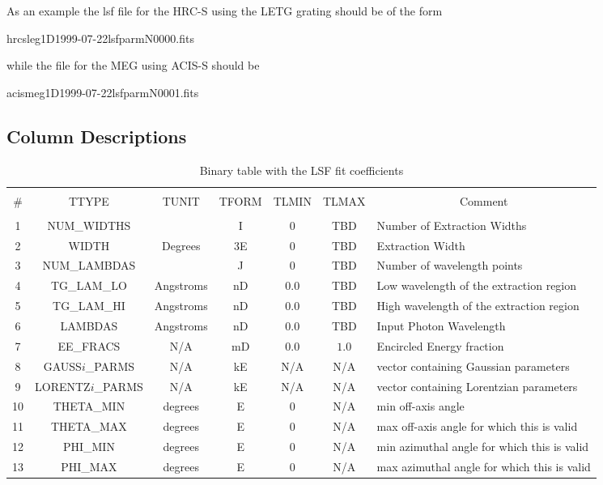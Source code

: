 \documentclass[twoside]{article}
\begin{document}
As an example the lsf file for the HRC-S using the LETG grating should 
be of the form 

hrcsleg1D1999-07-22lsfparmN0000.fits

while the file for the MEG using ACIS-S should be 

acismeg1D1999-07-22lsfparmN0001.fits

\subsection{Column Descriptions}

\begin{table}[h]
\begin{center}
{\small
\begin{tabular}{|c|c|c|c|c|c|p{1.8in}|}
\hline
 & & & & & & \\
 \#
 & TTYPE
 & TUNIT
 & TFORM 
 & TLMIN
 & TLMAX
 & \multicolumn{1}{|c|}{Comment}\\
 & & & & & & \\\hline
%
 1
 & NUM\_WIDTHS
 & 
 & I
 & 0
 & \sc TBD
 & Number of Extraction Widths \\\hline
%
 2
 & WIDTH
 & Degrees
 & 3E
 & 0
 & \sc TBD
 & Extraction Width \\\hline
%
 3
 & NUM\_LAMBDAS
 & 
 & J
 & 0
 & \sc TBD
 & Number of wavelength points \\\hline
%
 4
 & TG\_LAM\_LO
 & Angstroms
 & nD
 & $0.0$
 & \sc TBD
 & Low wavelength of the extraction region\\\hline
%
 5
 & TG\_LAM\_HI
 & Angstroms
 & nD
 & $0.0$
 & \sc TBD
 & High wavelength of the extraction region\\\hline
%
 6
 & LAMBDAS
 & Angstroms
 & nD
 & $0.0$
 & \sc TBD
 & Input Photon Wavelength \\\hline
%
 7
 & EE\_FRACS
 & N/A
 & mD
 & $0.0$
 & $1.0$
 & Encircled Energy fraction\\\hline
%
 8
 & GAUSS$i$\_PARMS
 & N/A
 & kE
 & N/A
 & N/A
 & vector containing Gaussian parameters\\\hline
%
 9
 & LORENTZ$i$\_PARMS
 & N/A
 & kE
 & N/A
 & N/A
 & vector containing Lorentzian parameters\\\hline
%
 10
 & THETA\_MIN
 & degrees
 & E
 & 0
 & N/A
 & min off-axis angle\\\hline
%
 11
 & THETA\_MAX
 & degrees
 & E
 & 0
 & N/A
 & max off-axis angle for which this is valid\\\hline
%
 12
 & PHI\_MIN
 & degrees
 & E
 & 0
 & N/A
 & min azimuthal angle for which this is valid\\\hline
%
 13
 & PHI\_MAX
 & degrees
 & E
 & 0
 & N/A
 & max azimuthal angle for which this is valid\\\hline
%
%
\end{tabular}
}%
\caption{Binary table with the LSF fit coefficients}
\label{tab:parms}
\end{center}
\end{table}%
\end{document}
